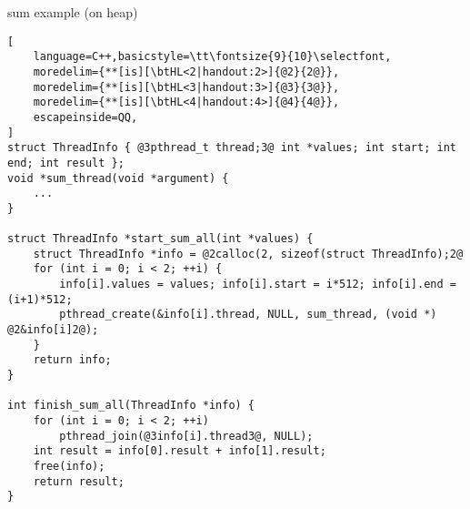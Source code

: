 \begin{frame}[fragile,label=sumAllHeap]{sum example (on heap)}
\begin{lstlisting}[
    language=C++,basicstyle=\tt\fontsize{9}{10}\selectfont,
    moredelim={**[is][\btHL<2|handout:2>]{@2}{2@}},
    moredelim={**[is][\btHL<3|handout:3>]{@3}{3@}},
    moredelim={**[is][\btHL<4|handout:4>]{@4}{4@}},
    escapeinside=QQ,
]
struct ThreadInfo { @3pthread_t thread;3@ int *values; int start; int end; int result };
void *sum_thread(void *argument) {
    ...
}

struct ThreadInfo *start_sum_all(int *values) {
    struct ThreadInfo *info = @2calloc(2, sizeof(struct ThreadInfo);2@
    for (int i = 0; i < 2; ++i) {
        info[i].values = values; info[i].start = i*512; info[i].end = (i+1)*512;
        pthread_create(&info[i].thread, NULL, sum_thread, (void *) @2&info[i]2@);
    }
    return info;
}

int finish_sum_all(ThreadInfo *info) {
    for (int i = 0; i < 2; ++i)
        pthread_join(@3info[i].thread3@, NULL);
    int result = info[0].result + info[1].result;
    free(info);
    return result;
}
\end{lstlisting}
\end{frame}

